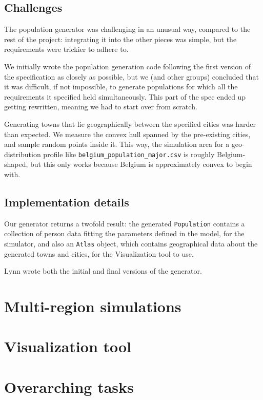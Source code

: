 \documentclass[a4paper,12pt]{article}
\begin{document}
\subsection{Challenges}
The population generator was challenging in an unusual way, compared to the rest of the project: integrating it into the other pieces was simple, but the requirements were trickier to adhere to.

We initially wrote the population generation code following the first version of the specification as closely as possible, but we (and other groups) concluded that it was difficult, if not impossible, to generate populations for which all the requirements it specified held simultaneously. This part of the spec ended up getting rewritten, meaning we had to start over from scratch.

Generating towns that lie geographically between the specified cities was harder than expected. We measure the convex hull spanned by the pre-existing cities, and sample random points inside it. This way, the simulation area for a geo-distribution profile like \texttt{belgium\_population\_major.csv} is roughly Belgium-shaped, but this only works because Belgium is approximately convex to begin with.

\subsection{Implementation details}
Our generator returns a twofold result: the generated \texttt{Population} contains a collection of person data fitting the parameters defined in the model, for the simulator, and also an \texttt{Atlas} object, which contains geographical data about the generated towns and cities, for the Visualization tool to use.

Lynn wrote both the initial and final versions of the generator.

\section{Multi-region simulations}

\section{Visualization tool}

\section{Overarching tasks}
\end{document}
